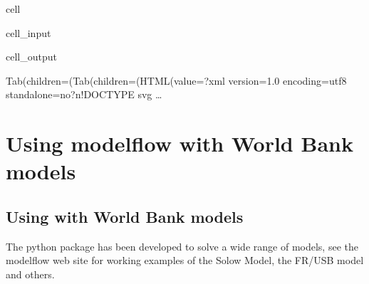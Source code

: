 \documentclass[letterpaper,10pt,english]{jupyterBook}
\begin{document}
\begin{sphinxuseclass}{cell}\begin{sphinxVerbatimInput}

\begin{sphinxuseclass}{cell_input}
\begin{sphinxVerbatim}[commandchars=\\\{\}]
\PYG{p}{[}\PYG{p}{]}
\end{sphinxVerbatim}

\end{sphinxuseclass}\end{sphinxVerbatimInput}
\begin{sphinxVerbatimOutput}

\begin{sphinxuseclass}{cell_output}
\begin{sphinxVerbatim}[commandchars=\\\{\}]
Tab(children=(Tab(children=(HTML(value=\PYGZsq{}\PYGZlt{}?xml version=\PYGZdq{}1.0\PYGZdq{} encoding=\PYGZdq{}utf\PYGZhy{}8\PYGZdq{} standalone=\PYGZdq{}no\PYGZdq{}?\PYGZgt{}\PYGZbs{}n\PYGZlt{}!DOCTYPE svg …
\end{sphinxVerbatim}

\begin{sphinxVerbatim}[commandchars=\\\{\}]

\end{sphinxVerbatim}

\end{sphinxuseclass}\end{sphinxVerbatimOutput}

\end{sphinxuseclass}
\sphinxstepscope


\part{Using modelflow with World Bank models}

\sphinxstepscope


\chapter{Using  with World Bank models}
\label{\detokenize{content/06_WBModels/LoadingWBModel:using-modelflow-with-world-bank-models}}\label{\detokenize{content/06_WBModels/LoadingWBModel::doc}}
\sphinxAtStartPar
The  python package has been developed to solve a wide range of models, see the modelflow  web site for working examples of the Solow Model, the FR/USB model and others.
\end{document}
